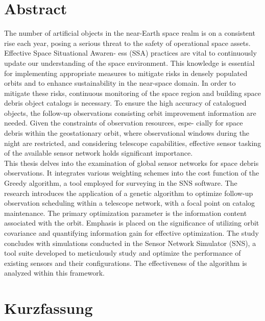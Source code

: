 \chapter*{Abstract}

The number of artificial objects in the near-Earth space realm is on a consistent rise each year,
posing a serious threat to the safety of operational space assets. Effective Space Situational Awaren-
ess (SSA) practices are vital to continuously update our understanding of the space environment.
This knowledge is essential for implementing appropriate measures to mitigate risks in densely
populated orbits and to enhance sustainability in the near-space domain. In order to mitigate these
risks, continuous monitoring of the space region and building space debris object catalogs is
necessary. To ensure the high accuracy of catalogued objects, the follow-up observations consisting
orbit improvement information are needed. Given the constraints of observation resources, espe-
cially for space debris within the geostationary orbit, where observational windows during the night
are restricted, and considering telescope capabilities, effective sensor tasking of the available sensor network
holds significant importance.\\

This thesis delves into the examination of global sensor networks for space debris observations. It integrates various weighting schemes into the cost function of 
the Greedy algorithm, a tool employed for surveying in the SNS software. The research introduces the application of a genetic algorithm to optimize follow-up observation 
scheduling within a telescope network, with a focal point on catalog maintenance. The primary optimization parameter is the information content associated with the orbit. 
Emphasis is placed on the significance of utilizing orbit covariance and quantifying information gain for effective optimization.
The study concludes with simulations conducted in the Sensor Network Simulator (SNS), a tool suite developed to meticulously study and optimize the performance of existing sensors and their configurations. The effectiveness of the algorithm is analyzed within this framework.

\pagebreak

\chapter*{Kurzfassung}


